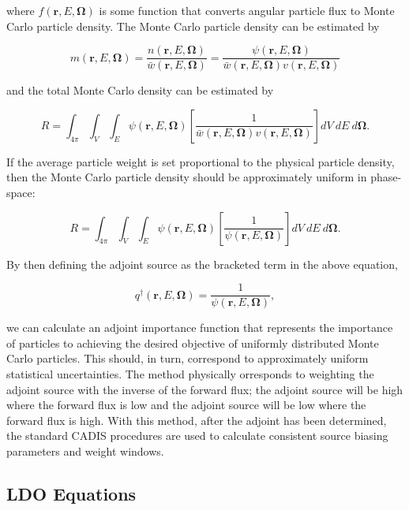 \documentclass{article} %
\newcommand{\bo}{\mathbf\Omega}
\newcommand{\vecr}{\textbf{r}}
\begin{document}
\noindent where $f(\vecr,E,\bo)$ is some function that converts angular
particle flux to Monte Carlo particle density. The Monte Carlo particle 
density can be estimated by

\begin{equation}
m(\vecr,E,\bo) = \frac{n(\vecr,E,\bo)}{\bar{w}(\vecr,E,\bo)} 
= \frac{\psi(\vecr,E,\bo)}{\bar{w}(\vecr,E,\bo)v(\vecr,E,\bo)}
\end{equation}

\noindent and the total Monte Carlo density can be estimated by

\begin{equation}
R = \int_{4\pi}\int_{V}\int_{E}\psi(\vecr,E,\bo)
\left[\frac{1}{\bar{w}(\vecr,E,\bo)v(\vecr,E,\bo)}\right]dV\ dE\ d\bo.
\label{eq:fwcadis_r}
\end{equation}

If the average particle weight is set proportional to the physical particle
density, then the Monte Carlo particle density should be approximately uniform
in phase-space:

\begin{equation}
R = \int_{4\pi}\int_{V}\int_{E}\psi(\vecr,E,\bo)
\left[\frac{1}{\psi(\vecr,E,\bo)}\right]dV\ dE\ d\bo.
\end{equation}

\noindent By then defining the adjoint source as the bracketed term in the
above equation,

\begin{equation}
q^{\dagger}(\vecr,E,\bo) = \frac{1}{\psi(\vecr,E,\bo)},
\end{equation}

\noindent we can calculate an adjoint importance function that represents the
importance of particles to achieving the desired objective of uniformly
distributed Monte Carlo particles. This should, in turn, correspond to
approximately uniform statistical uncertainties. The method physically 
orresponds to weighting the adjoint source with the inverse of the forward
flux; the adjoint source will be high where the forward flux is low and the
adjoint source will be low where the forward flux is high. With this method,
after the adjoint has been determined, the standard CADIS procedures are used
to calculate consistent source biasing parameters and weight windows.

\subsection{LDO Equations}
\end{document}
